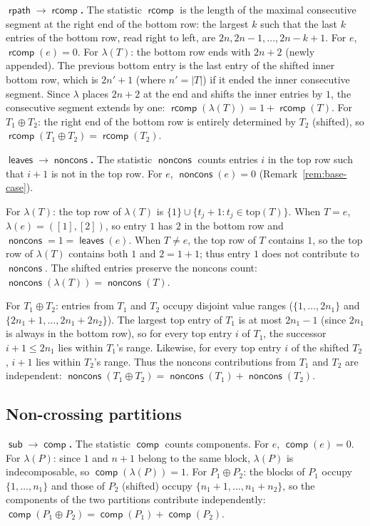 \documentclass[a4paper,11pt]{article}
\theoremstyle{definition}
\DeclareMathOperator{\comp}{\mathsf{comp}}
\DeclareMathOperator{\rcomp}{\mathsf{rcomp}}
\DeclareMathOperator{\rpath}{\mathsf{rpath}}
\DeclareMathOperator{\leaves}{\mathsf{leaves}}
\DeclareMathOperator{\noncons}{\mathsf{noncons}}
\DeclareMathOperator{\subtrees}{\mathsf{sub}}
\begin{document}
\textbf{$\boldsymbol{\rpath \to \rcomp}$.}
The statistic $\rcomp$ is the length of the maximal
consecutive segment at the right end of the bottom row:
the largest $k$ such that the last $k$ entries of the
bottom row, read right to left, are
$2n, 2n{-}1, \ldots, 2n{-}k{+}1$. For $e$,
$\rcomp(e) = 0$. For $\lambda(T)$: the bottom row ends
with $2n{+}2$ (newly appended). The previous bottom
entry is the last entry of the shifted inner bottom row,
which is $2n' + 1$ (where $n' = |T|$) if it ended the
inner consecutive segment. Since $\lambda$ places
$2n{+}2$ at the end and shifts the inner entries by $1$,
the consecutive segment extends by one:
$\rcomp(\lambda(T)) = 1 + \rcomp(T)$.
For $T_1 \oplus T_2$: the right end of the bottom row is
entirely determined by $T_2$ (shifted), so
$\rcomp(T_1 \oplus T_2) = \rcomp(T_2)$.

\textbf{$\boldsymbol{\leaves \to \noncons}$.}
The statistic $\noncons$ counts entries $i$ in the top
row such that $i{+}1$ is not in the top row. For $e$,
$\noncons(e) = 0$ (Remark~\ref{rem:base-case}).

For $\lambda(T)$: the top row of $\lambda(T)$ is
$\{1\} \cup \{t_j + 1 : t_j \in \text{top}(T)\}$.
When $T = e$, $\lambda(e) = ([1], [2])$, so entry $1$
has $2$ in the bottom row and
$\noncons = 1 = \leaves(e)$. When $T \neq e$, the top
row of $T$ contains $1$, so the top row of $\lambda(T)$
contains both $1$ and $2 = 1 + 1$; thus entry $1$ does
not contribute to $\noncons$. The shifted entries
preserve the noncons count:
$\noncons(\lambda(T)) = \noncons(T)$.

For $T_1 \oplus T_2$: entries from $T_1$ and $T_2$
occupy disjoint value ranges ($\{1, \ldots, 2n_1\}$ and
$\{2n_1{+}1, \ldots, 2n_1{+}2n_2\}$). The largest top
entry of $T_1$ is at most $2n_1 - 1$ (since $2n_1$ is
always in the bottom row), so for every top entry $i$ of
$T_1$, the successor $i + 1 \leq 2n_1$ lies within
$T_1$'s range. Likewise, for every top entry $i$ of the
shifted $T_2$, $i + 1$ lies within $T_2$'s range. Thus
the noncons contributions from $T_1$ and $T_2$ are
independent:
$\noncons(T_1 \oplus T_2)
= \noncons(T_1) + \noncons(T_2)$.

\subsection{Non-crossing partitions}\label{sec:dict-ncp}

\textbf{$\boldsymbol{\subtrees \to \comp}$.}
The statistic $\comp$ counts components. For
$e$, $\comp(e) = 0$. For $\lambda(P)$: since $1$ and
$n{+}1$ belong to the same block, $\lambda(P)$ is
indecomposable, so $\comp(\lambda(P)) = 1$.
For $P_1 \oplus P_2$: the blocks of $P_1$ occupy
$\{1, \ldots, n_1\}$ and those of $P_2$ (shifted)
occupy $\{n_1{+}1, \ldots, n_1{+}n_2\}$, so the
components of the two partitions
contribute independently:
$\comp(P_1 \oplus P_2)
= \comp(P_1) + \comp(P_2)$.
\end{document}
